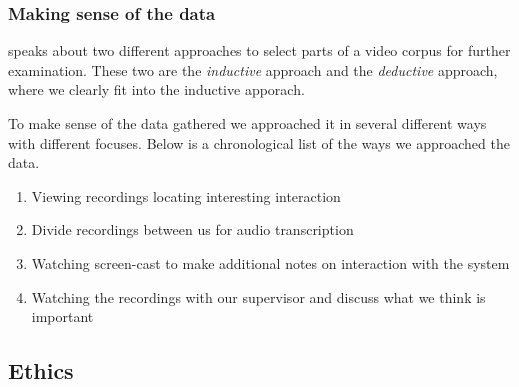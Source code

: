 \subsubsection{Making sense of the data}
\citeauthor{derry2010conducting} speaks about two different approaches to select parts of a video corpus for further examination. These two are the \emph{inductive} approach and the \emph{deductive} approach, where we clearly fit into the inductive apporach.

To make sense of the data gathered we approached it in several different ways with different focuses. Below is a chronological list of the ways we approached the data. 

\begin{enumerate}
\item{Viewing recordings locating interesting interaction}
\item{Divide recordings between us for audio transcription}
\item{Watching screen-cast to make additional notes on interaction with the system}
\item{Watching the recordings with our supervisor and discuss what we think is important}
\end{enumerate}

\subsection{Ethics}



